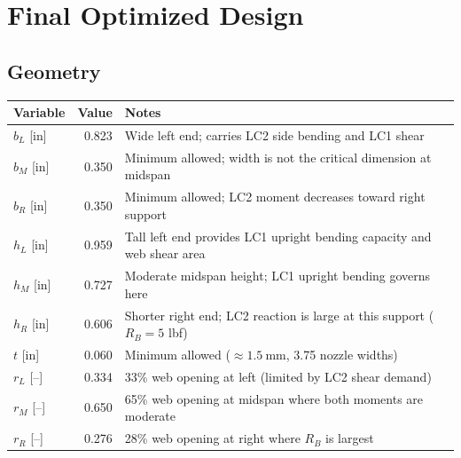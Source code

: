 \documentclass[11pt,letterpaper]{article}
\begin{document}
\section{Final Optimized Design}
\label{sec:design}

\subsection{Geometry}

\begin{center}
\begin{tabular}{lrl}
\toprule
Variable & Value & Notes \\
\midrule
$b_L$ [in] & 0.823 & Wide left end; carries LC2 side bending and LC1 shear \\
$b_M$ [in] & 0.350 & Minimum allowed; width is not the critical dimension at midspan \\
$b_R$ [in] & 0.350 & Minimum allowed; LC2 moment decreases toward right support \\
$h_L$ [in] & 0.959 & Tall left end provides LC1 upright bending capacity and web shear area \\
$h_M$ [in] & 0.727 & Moderate midspan height; LC1 upright bending governs here \\
$h_R$ [in] & 0.606 & Shorter right end; LC2 reaction is large at this support ($R_B=5$ lbf) \\
$t$ [in]   & 0.060 & Minimum allowed ($\approx 1.5\ \mathrm{mm}$, 3.75 nozzle widths) \\
$r_L$ [--] & 0.334 & 33\% web opening at left (limited by LC2 shear demand) \\
$r_M$ [--] & 0.650 & 65\% web opening at midspan where both moments are moderate \\
$r_R$ [--] & 0.276 & 28\% web opening at right where $R_B$ is largest \\
\bottomrule
\end{tabular}
\end{center}
\end{document}
